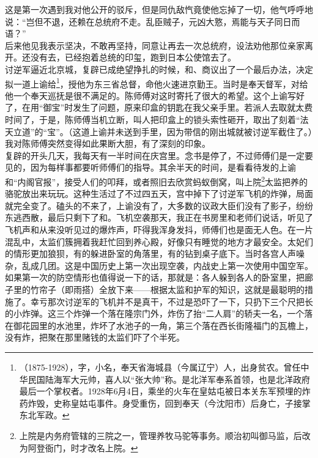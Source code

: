 这是第一次遇到我对他公开的驳斥，但是同仇敌忾竟使他忘掉了一切，他气呼呼地说：“岂但不退，还赖在总统府不走。乱臣贼子，元凶大憝，焉能与天子同日而语？”\\

后来他见我表示坚决，不敢再坚持，同意让再去一次总统府，设法劝他那位亲家离开。还没有去，已经抱着总统的印玺，跑到日本公使馆去了。\\

讨逆军逼近北京城，复辟已成绝望挣扎的时候，和、商议出了一个最后办法，决定拟一道上谕给\footnote{（1875-1928），字，小名，奉天省海城县（今属辽宁）人，出身贫农。曾任中华民国陆海军大元帅，喜人以“张大帅”称。是北洋军奉系首领，也是北洋政府最后一个掌权者。1928年6月4日，乘坐的火车在皇姑屯被日本关东军预埋的炸药炸毁，史称皇姑屯事件。身受重伤，回到奉天（今沈阳市）后身亡，子接掌东北军政。}，授他为东三省总督，命他火速进京勤王。当时是奉天督军，对给他一个奉天巡抚是很不满足的。陈师傅对这时寄托了很大的希望。这个上谕写好了，在用“御宝”时发生了问题，原来印盒的钥匙在我父亲手里。若派人去取就太费时间了，于是，陈师傅当机立断，叫人把印盒上的锁头索性砸开，取出了刻着“法天立道”的“宝”。（这道上谕并未送到手里，因为带信的刚出城就被讨逆军截住了。）我对陈师傅突然变得如此果断大胆，有了深刻的印象。\\

复辟的开头几天，我每天有一半时间在庆宫里。念书是停了，不过师傅们是一定要见的，因为每样事都要听师傅们的指导。其余半天的时间，是看看待发的上谕和“内阁官报”，接受人们的叩拜，或者照旧去欣赏蚂蚁倒窝，叫上院\footnote{上院是内务府管辖的三院之一，管理养牧马驼等事务。顺治初叫御马监，后改为阿登衙门，时才改名上院。}太监把养的骆驼放出来玩玩。这种生活过了不过四五天，宫中掉下了讨逆军飞机的炸弹，局面就完全变了。磕头的不来了，上谕没有了，大多数的议政大臣们没有了影子，纷纷东逃西散，最后只剩下了和。飞机空袭那天，我正在书房里和老师们说话，听见了飞机声和从来没听见过的爆炸声，吓得我浑身发抖，师傅们也是面无人色。在一片混乱中，太监们簇拥着我赶忙回到养心殿，好像只有睡觉的地方才最安全。太妃们的情形更加狼狈，有的躲进卧室的角落里，有的钻到桌子底下。当时各宫人声噪杂，乱成几团。这是中国历史上第一次出现空袭，内战史上第一次使用中国空军。如果第一次的防空情形也值得说一下的话，那就是：各人躲到各人的卧室里，把廊子里的竹帘子（即雨搭）全放下来——根据太监和护军的知识，这就是最聪明的措施了。幸亏那次讨逆军的飞机并不是真干，不过是恐吓了一下，只扔下三个尺把长的小炸弹。这三个炸弹一个落在隆宗门外，炸伤了抬“二人肩”的轿夫一名，一个落在御花园里的水池里，炸坏了水池子的一角，第三个落在西长街隆福门的瓦檐上，没有炸，把聚在那里赌钱的太监们吓了个半死。\\

